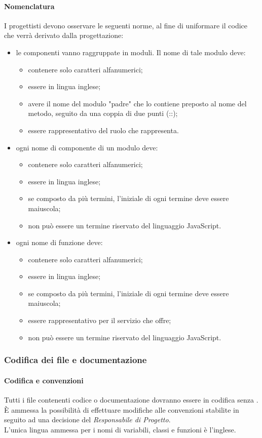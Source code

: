 \paragraph{Nomenclatura}
I progettisti devono osservare le seguenti norme, al fine di uniformare il codice che verrà derivato dalla progettazione:
\begin{itemize}
\item le componenti vanno raggruppate in moduli. Il nome di tale modulo deve:
\begin{itemize}
\item contenere solo caratteri alfanumerici;
\item essere in lingua inglese;
\item avere il nome del modulo "padre" che lo contiene preposto al nome del metodo, seguito da una coppia di due punti (::);
\item essere rappresentativo del ruolo che rappresenta.
\end{itemize}
\item ogni nome di componente di un modulo deve:
\begin{itemize}
\item contenere solo caratteri alfanumerici;
\item essere in lingua inglese;
\item se composto da più termini, l'iniziale di ogni termine deve essere maiuscola;
\item non può essere un termine riservato del linguaggio JavaScript.
\end{itemize}
\item ogni nome di funzione deve:
\begin{itemize}
\item contenere solo caratteri alfanumerici;
\item essere in lingua inglese;
\item se composto da più termini, l'iniziale di ogni termine deve essere maiuscola;
\item essere rappresentativo per il servizio che offre;
\item non può essere un termine riservato del linguaggio JavaScript.
\end{itemize}
\end{itemize}

\subsubsection{Codifica dei file e documentazione}
   \paragraph{Codifica e convenzioni}
   Tutti i file contenenti codice o documentazione dovranno essere in codifica  senza .\\
   È ammessa la possibilità di effettuare modifiche alle convenzioni stabilite in seguito ad una decisione del \emph{Responsabile di Progetto}.\\
   L’unica lingua ammessa per i nomi di variabili, classi e funzioni è l’inglese.


